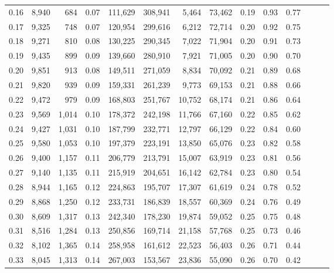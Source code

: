 \begin{tabular}{rrrrrrrrrrrrrr}
0.16 &   8,940 &    684 &  0.07 &  111,629 &  308,941 &   5,464 &  73,462 &  0.19 &  0.93 &      0.77 \\
0.17 &   9,325 &    748 &  0.07 &  120,954 &  299,616 &   6,212 &  72,714 &  0.20 &  0.92 &      0.75 \\
0.18 &   9,271 &    810 &  0.08 &  130,225 &  290,345 &   7,022 &  71,904 &  0.20 &  0.91 &      0.73 \\
0.19 &   9,435 &    899 &  0.09 &  139,660 &  280,910 &   7,921 &  71,005 &  0.20 &  0.90 &      0.70 \\
0.20 &   9,851 &    913 &  0.08 &  149,511 &  271,059 &   8,834 &  70,092 &  0.21 &  0.89 &      0.68 \\
0.21 &   9,820 &    939 &  0.09 &  159,331 &  261,239 &   9,773 &  69,153 &  0.21 &  0.88 &      0.66 \\
0.22 &   9,472 &    979 &  0.09 &  168,803 &  251,767 &  10,752 &  68,174 &  0.21 &  0.86 &      0.64 \\
0.23 &   9,569 &  1,014 &  0.10 &  178,372 &  242,198 &  11,766 &  67,160 &  0.22 &  0.85 &      0.62 \\
0.24 &   9,427 &  1,031 &  0.10 &  187,799 &  232,771 &  12,797 &  66,129 &  0.22 &  0.84 &      0.60 \\
0.25 &   9,580 &  1,053 &  0.10 &  197,379 &  223,191 &  13,850 &  65,076 &  0.23 &  0.82 &      0.58 \\
0.26 &   9,400 &  1,157 &  0.11 &  206,779 &  213,791 &  15,007 &  63,919 &  0.23 &  0.81 &      0.56 \\
0.27 &   9,140 &  1,135 &  0.11 &  215,919 &  204,651 &  16,142 &  62,784 &  0.23 &  0.80 &      0.54 \\
0.28 &   8,944 &  1,165 &  0.12 &  224,863 &  195,707 &  17,307 &  61,619 &  0.24 &  0.78 &      0.52 \\
0.29 &   8,868 &  1,250 &  0.12 &  233,731 &  186,839 &  18,557 &  60,369 &  0.24 &  0.76 &      0.49 \\
0.30 &   8,609 &  1,317 &  0.13 &  242,340 &  178,230 &  19,874 &  59,052 &  0.25 &  0.75 &      0.48 \\
0.31 &   8,516 &  1,284 &  0.13 &  250,856 &  169,714 &  21,158 &  57,768 &  0.25 &  0.73 &      0.46 \\
0.32 &   8,102 &  1,365 &  0.14 &  258,958 &  161,612 &  22,523 &  56,403 &  0.26 &  0.71 &      0.44 \\
0.33 &   8,045 &  1,313 &  0.14 &  267,003 &  153,567 &  23,836 &  55,090 &  0.26 &  0.70 &      0.42 \\

\end{tabular}

